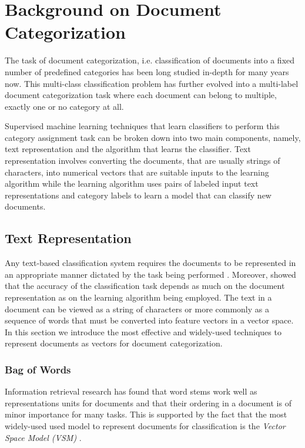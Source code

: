 \chapter{Background on Document Categorization}
\label{chapter:relatedwork}
The task of document categorization, i.e. classification of documents into a fixed number of predefined categories has been long studied in-depth for many years now. This multi-class classification problem has further evolved into a multi-label document categorization task where each document can belong to multiple, exactly one or no category at all. 

Supervised machine learning techniques that learn classifiers to perform this category assignment task can be broken down into two main components, namely, text representation and the algorithm that learns the classifier. 
Text representation involves converting the documents, that are usually strings of characters, into numerical vectors that are suitable inputs to the learning algorithm while the learning algorithm uses pairs of labeled input text representations and category labels to learn a model that can classify new documents.

\section{Text Representation}
\label{sec:textrepr}
Any text-based classification system requires the documents to be 
represented in an appropriate manner dictated by the task being 
performed \citep{lewis1992text}. Moreover, \citet{quinlan1983learning} 
showed that the accuracy of the classification task depends as much on 
the document representation as on the learning algorithm being employed. 
The text in a document can be viewed as a string of characters or more 
commonly as a sequence of words that must be converted into feature vectors in a vector space. In this section we introduce the most effective and widely-used techniques to represent documents as vectors for document categorization.

\subsection{Bag of Words}
Information retrieval research has found that word stems work well as representations units for documents and that their ordering in a document is of minor importance for many tasks. This is supported by the fact that the most widely-used used model to represent documents for classification is the \emph{Vector Space Model (VSM)} \citep{salton1973specification}. 


